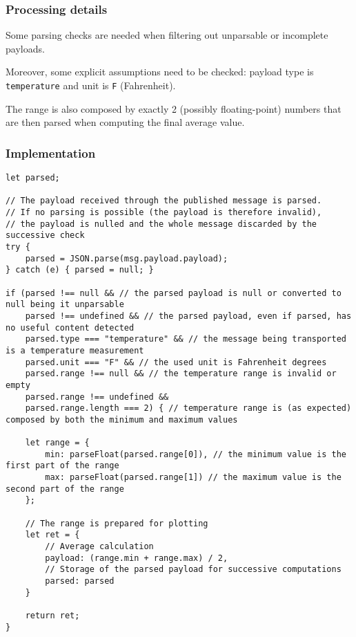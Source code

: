 \documentclass[a4paper,11pt]{article} %
\begin{document}
    \subsubsection{Processing details}

    Some parsing checks are needed when filtering out unparsable or incomplete payloads.

    \smallskip

    Moreover, some explicit assumptions need to be checked: payload type is \texttt{temperature} and unit is \texttt{F} (Fahrenheit).

    \smallskip

    The range is also composed by exactly 2 (possibly floating-point) numbers that are then parsed when computing the final average value.

    \smallskip

    \subsubsection{Implementation}

    \begin{verbatim}
let parsed;

// The payload received through the published message is parsed.
// If no parsing is possible (the payload is therefore invalid),
// the payload is nulled and the whole message discarded by the successive check
try {
    parsed = JSON.parse(msg.payload.payload);
} catch (e) { parsed = null; }

if (parsed !== null && // the parsed payload is null or converted to null being it unparsable
    parsed !== undefined && // the parsed payload, even if parsed, has no useful content detected
    parsed.type === "temperature" && // the message being transported is a temperature measurement
    parsed.unit === "F" && // the used unit is Fahrenheit degrees
    parsed.range !== null && // the temperature range is invalid or empty
    parsed.range !== undefined &&
    parsed.range.length === 2) { // temperature range is (as expected) composed by both the minimum and maximum values

    let range = {
        min: parseFloat(parsed.range[0]), // the minimum value is the first part of the range
        max: parseFloat(parsed.range[1]) // the maximum value is the second part of the range
    };

    // The range is prepared for plotting
    let ret = {
        // Average calculation
        payload: (range.min + range.max) / 2,
        // Storage of the parsed payload for successive computations
        parsed: parsed
    }

    return ret;
}
    \end{verbatim}
\end{document}
